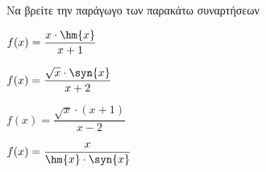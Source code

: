 Να βρείτε την παράγωγο των παρακάτω συναρτήσεων
\begin{multicols}{2}
\begin{alist}
\item $ f(x)=\dfrac{x\cdot\hm{x}}{x+1} $
\item $ f(x)=\dfrac{\sqrt{x}\cdot\syn{x}}{x+2} $
\item $ f(x)=\dfrac{\sqrt{x}\cdot(x+1)}{x-2} $
\item $ f(x)=\dfrac{x}{\hm{x}\cdot\syn{x}} $
\end{alist}
\end{multicols}
